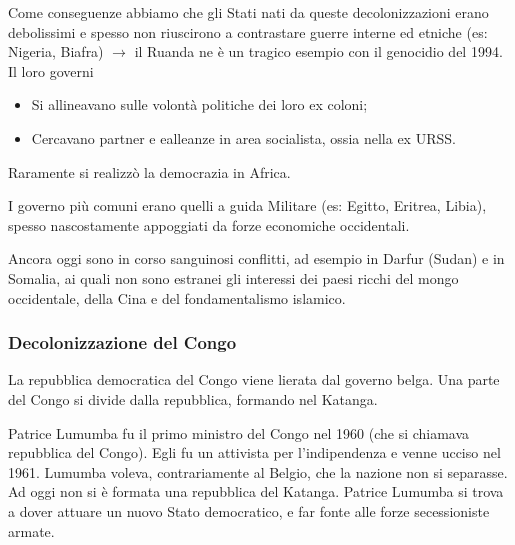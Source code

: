 \documentclass[a4paper]{article}
\begin{document}

Come conseguenze abbiamo che gli Stati nati da queste decolonizzazioni
erano debolissimi e spesso non riuscirono a
contrastare guerre interne ed etniche (es: Nigeria, Biafra)
\(\rightarrow\) il Ruanda ne è un tragico esempio con il genocidio del 1994.
\\
Il loro governi
\begin{itemize}
    \item Si allineavano sulle volontà politiche dei loro ex coloni;
    \item Cercavano partner e ealleanze in area socialista, ossia nella ex URSS.
\end{itemize}
Raramente si realizzò la democrazia in Africa.

I governo più comuni erano quelli a guida Militare (es: Egitto, Eritrea, Libia),
spesso nascostamente appoggiati da forze economiche occidentali.

Ancora oggi sono in corso sanguinosi conflitti, ad esempio in Darfur (Sudan)
e in Somalia, ai quali non sono estranei gli interessi dei paesi ricchi del mongo
occidentale, della Cina e del fondamentalismo islamico.

\subsubsection{Decolonizzazione del Congo}

La repubblica democratica del Congo viene lierata dal governo belga.
Una parte del Congo si divide dalla repubblica, formando nel Katanga.


Patrice Lumumba fu il primo ministro del Congo nel 1960 (che si chiamava repubblica del Congo).
Egli fu un attivista per l'indipendenza e venne ucciso nel 1961.
Lumumba voleva, contrariamente al Belgio, che la nazione non si separasse.
Ad oggi non si è formata una repubblica del Katanga.
Patrice Lumumba si trova a dover attuare un nuovo Stato democratico,
e far fonte alle forze secessioniste armate.


\end{document}
